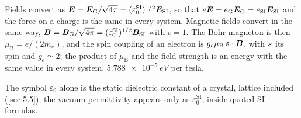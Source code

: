 Fields convert as $\bm{E} = \bm{E}_{\mathrm{G}}/\sqrt{4\pi} = (\varepsilon_0^{\mathrm{SI}})^{1/2}\bm{E}_{\mathrm{SI}}$, so that $e\bm{E} = e_{\mathrm{G}}\bm{E}_{\mathrm{G}} = e_{\mathrm{SI}}\bm{E}_{\mathrm{SI}}$ and the force on a charge is the same in every system. Magnetic fields convert in the same way, $\bm{B} = \bm{B}_{\mathrm{G}}/\sqrt{4\pi} = (\varepsilon_0^{\mathrm{SI}})^{1/2}\bm{B}_{\mathrm{SI}}$ with $c = 1$. The Bohr magneton is then $\mu_{\mathrm{B}} = e/(2m_e)$, and the spin coupling of an electron is $g_e\mu_{\mathrm{B}}\,\bm{s}\cdot\bm{B}$, with $\bm{s}$ its spin and $g_e \simeq 2$; the product of $\mu_{\mathrm{B}}$ and the field strength is an energy with the same value in every system, $\SI{5.788e-5}{eV}$ per tesla.

The symbol $\varepsilon_0$ alone is the static dielectric constant of a crystal, lattice included (\cref{sec:5.5}); the vacuum permittivity appears only as $\varepsilon_0^{\mathrm{SI}}$, inside quoted SI formulas.
